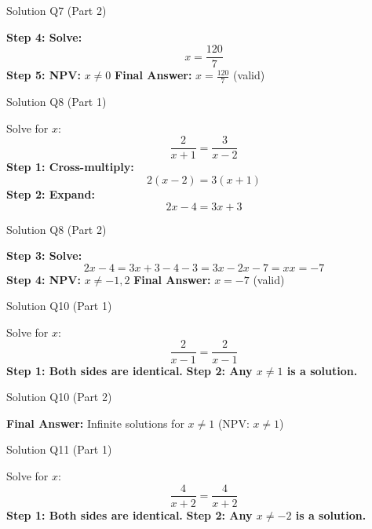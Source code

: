 \documentclass[aspectratio=169]{beamer}
\begin{document}
\begin{frame}{Solution Q7 (Part 2)}
\begin{tcolorbox}[colback=lightgray,colframe=accent,title=Solution Q7 (Part 2)]
\footnotesize
\textbf{Step 4: Solve:}
\[
x = \frac{120}{7}
\]
\textbf{Step 5: NPV:} $x \neq 0$
\textbf{Final Answer:} $x=\frac{120}{7}$ (valid)
\end{tcolorbox}
\end{frame}

\begin{frame}{Solution Q8 (Part 1)}
\begin{tcolorbox}[colback=lightgray,colframe=accent,title=Solution Q8 (Part 1)]
\footnotesize
Solve for $x$:
\[
\frac{2}{x+1} = \frac{3}{x-2}
\]
\textbf{Step 1: Cross-multiply:}
\[
2(x-2) = 3(x+1)
\]
\textbf{Step 2: Expand:}
\[
2x - 4 = 3x + 3
\]
\end{tcolorbox}
\end{frame}

\begin{frame}{Solution Q8 (Part 2)}
\begin{tcolorbox}[colback=lightgray,colframe=accent,title=Solution Q8 (Part 2)]
\footnotesize
\textbf{Step 3: Solve:}
\[
2x - 4 = 3x + 3
-4 - 3 = 3x - 2x
-7 = x
x = -7
\]
\textbf{Step 4: NPV:} $x \neq -1, 2$
\textbf{Final Answer:} $x = -7$ (valid)
\end{tcolorbox}
\end{frame}

\begin{frame}{Solution Q10 (Part 1)}
\begin{tcolorbox}[colback=lightgray,colframe=accent,title=Solution Q10 (Part 1)]
\footnotesize
Solve for $x$:
\[
\frac{2}{x-1} = \frac{2}{x-1}
\]
\textbf{Step 1: Both sides are identical.}
\textbf{Step 2: Any $x \neq 1$ is a solution.}
\end{tcolorbox}
\end{frame}

\begin{frame}{Solution Q10 (Part 2)}
\begin{tcolorbox}[colback=lightgray,colframe=accent,title=Solution Q10 (Part 2)]
\footnotesize
\textbf{Final Answer:} Infinite solutions for $x \neq 1$ (NPV: $x \neq 1$)
\end{tcolorbox}
\end{frame}

\begin{frame}{Solution Q11 (Part 1)}
\begin{tcolorbox}[colback=lightgray,colframe=accent,title=Solution Q11 (Part 1)]
\footnotesize
Solve for $x$:
\[
\frac{4}{x+2} = \frac{4}{x+2}
\]
\textbf{Step 1: Both sides are identical.}
\textbf{Step 2: Any $x \neq -2$ is a solution.}
\end{tcolorbox}
\end{frame}
\end{document}
